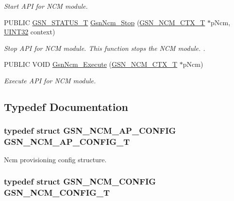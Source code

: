 \begin{DoxyCompactItemize}
\begin{DoxyCompactList}\small\item\em Start API for NCM module. \end{DoxyCompactList}\item 
PUBLIC \hyperlink{a00659_gae36517c0f5872426a7034c9551eb96ac}{GSN\_\-STATUS\_\-T} \hyperlink{a00688_ga36427555e14041e449831a66dfe58c39}{GsnNcm\_\-Stop} (\hyperlink{a00158}{GSN\_\-NCM\_\-CTX\_\-T} $\ast$pNcm, \hyperlink{a00660_gae1e6edbbc26d6fbc71a90190d0266018}{UINT32} context)
\begin{DoxyCompactList}\small\item\em Stop API for NCM module. This function stops the NCM module. . \end{DoxyCompactList}\item 
PUBLIC VOID \hyperlink{a00688_ga3ed4d28d4f2a8195d6c37f5032ee0bbd}{GsnNcm\_\-Execute} (\hyperlink{a00158}{GSN\_\-NCM\_\-CTX\_\-T} $\ast$pNcm)
\begin{DoxyCompactList}\small\item\em Execute API for NCM module. \end{DoxyCompactList}\end{DoxyCompactItemize}


\subsection{Typedef Documentation}
\hypertarget{a00688_ga881c978ce73a5c4c2e6e9080d4a07879}{
\subsubsection[{GSN\_\-NCM\_\-AP\_\-CONFIG\_\-T}]{\setlength{\rightskip}{0pt plus 5cm}typedef struct {\bf GSN\_\-NCM\_\-AP\_\-CONFIG} {\bf GSN\_\-NCM\_\-AP\_\-CONFIG\_\-T}}}
\label{a00688_ga881c978ce73a5c4c2e6e9080d4a07879}


Ncm provisioning config structure. 

\hypertarget{a00688_ga9095c8feaa607f7d67a5ff8db069ebf2}{
\subsubsection[{GSN\_\-NCM\_\-CONFIG\_\-T}]{\setlength{\rightskip}{0pt plus 5cm}typedef struct {\bf GSN\_\-NCM\_\-CONFIG} {\bf GSN\_\-NCM\_\-CONFIG\_\-T}}}
\label{a00688_ga9095c8feaa607f7d67a5ff8db069ebf2}


